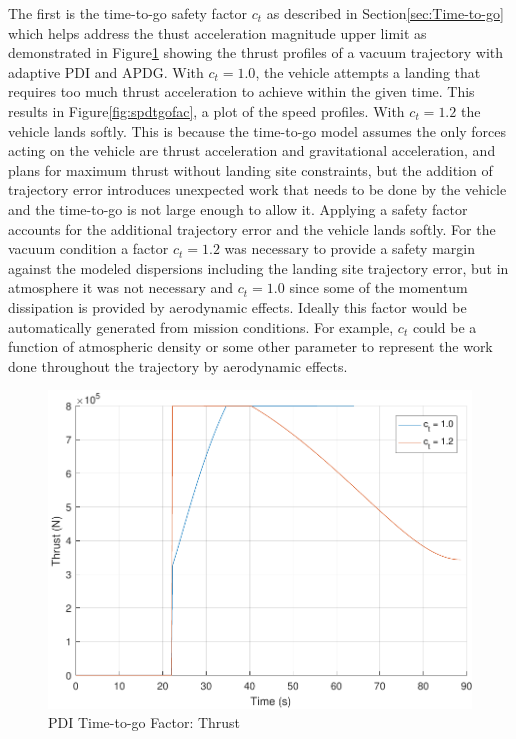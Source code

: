 The first is the time-to-go safety factor $c_t$ as described in Section\:\ref{sec:Time-to-go} which helps address the thust acceleration magnitude upper limit as demonstrated in Figure\:\ref{fig:thrtgofac} showing the thrust profiles of a vacuum trajectory with adaptive PDI and APDG. With $c_t = 1.0$, the vehicle attempts a landing that requires too much thrust acceleration to achieve within the given time. This results in Figure\:\ref{fig:spdtgofac}, a plot of the speed profiles. With $c_t = 1.2$ the vehicle lands softly. This is because the time-to-go model assumes the only forces acting on the vehicle are thrust acceleration and gravitational acceleration, and plans for maximum thrust without landing site constraints, but the addition of trajectory error introduces unexpected work that needs to be done by the vehicle and the time-to-go is not large enough to allow it. Applying a safety factor accounts for the additional trajectory error and the vehicle lands softly. For the vacuum condition a factor $c_t = 1.2$ was necessary to provide a safety margin against the modeled dispersions including the landing site trajectory error, but in atmosphere it was not necessary and $c_t = 1.0$ since some of the momentum dissipation is provided by aerodynamic effects. Ideally this factor would be automatically generated from mission conditions. For example, $c_t$ could be a function of atmospheric density or some other parameter to represent the work done throughout the trajectory by aerodynamic effects.

\begin{figure}[H]
	\centering
	\begin{minipage}{4.5 in}
		\includegraphics[width=\linewidth]{Figures/thrtgofac.pdf}
		\caption{PDI Time-to-go Factor: Thrust \label{fig:thrtgofac} }
	\end{minipage}
\end{figure}


